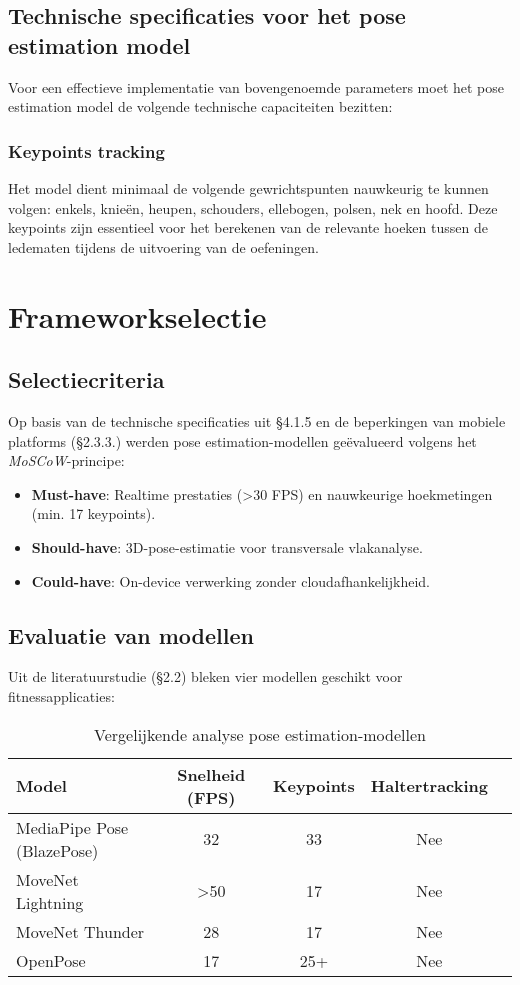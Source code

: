 \subsection{Technische specificaties voor het pose estimation model}

Voor een effectieve implementatie van bovengenoemde parameters moet het pose estimation model de volgende technische capaciteiten bezitten:

\subsubsection{Keypoints tracking}
Het model dient minimaal de volgende gewrichtspunten nauwkeurig te kunnen volgen: enkels, knieën, heupen, schouders, ellebogen, polsen, nek en hoofd.
Deze keypoints zijn essentieel voor het berekenen van de relevante hoeken tussen de ledematen tijdens de uitvoering van de oefeningen.

\section{Frameworkselectie}
\subsection{Selectiecriteria}

Op basis van de technische specificaties uit §4.1.5 en de beperkingen van mobiele platforms (§2.3.3.) werden pose estimation-modellen geëvalueerd volgens het \textit{MoSCoW}-principe:

\begin{itemize}
\item \textbf{Must-have}: Realtime prestaties (>30 FPS) en nauwkeurige hoekmetingen (min. 17 keypoints).
\item \textbf{Should-have}: 3D-pose-estimatie voor transversale vlakanalyse.
\item \textbf{Could-have}: On-device verwerking zonder cloudafhankelijkheid.
\end{itemize}

\subsection{Evaluatie van modellen}

Uit de literatuurstudie (§2.2) bleken vier modellen geschikt voor fitnessapplicaties:

\begin{table}[h]
    \centering
    \caption{Vergelijkende analyse pose estimation-modellen}
    \begin{tabular}{lcccl}
    \toprule
    Model & Snelheid (FPS) & Keypoints & Haltertracking \\
    \midrule
    MediaPipe Pose (BlazePose) & 32 & 33 & Nee \\
    MoveNet Lightning & >50 & 17 & Nee \\
    MoveNet Thunder & 28 & 17 & Nee \\
    OpenPose & 17 & 25+ & Nee \\ 
    \bottomrule
    \end{tabular}
    \label{tab:pose_models} 
    \end{table}

